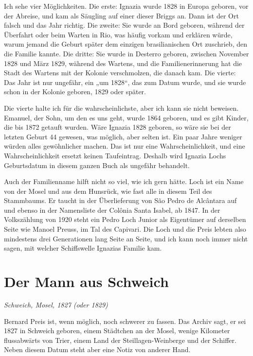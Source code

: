 \documentclass[
  ngerman,
  11pt,
  openany]{book}
\begin{document}
Ich sehe vier Möglichkeiten. Die erste: Ignazia wurde 1828 in Europa
geboren, vor der Abreise, und kam als Säugling auf einer dieser Briggs
an. Dann ist der Ort falsch und das Jahr richtig. Die zweite: Sie wurde
an Bord geboren, während der Überfahrt oder beim Warten in Rio, was
häufig vorkam und erklären würde, warum jemand die Geburt später dem
einzigen brasilianischen Ort zuschrieb, den die Familie kannte. Die
dritte: Sie wurde in Desterro geboren, zwischen November 1828 und März
1829, während des Wartens, und die Familienerinnerung hat die Stadt des
Wartens mit der Kolonie verschmolzen, die danach kam. Die vierte: Das
Jahr ist nur ungefähr, ein „um 1828``, das zum Datum wurde, und sie
wurde schon in der Kolonie geboren, 1829 oder später.

Die vierte halte ich für die wahrscheinlichste, aber ich kann sie nicht
beweisen. Emanuel, der Sohn, um den es uns geht, wurde 1864 geboren, und
es gibt Kinder, die bis 1872 getauft wurden. Wäre Ignazia 1828 geboren,
so wäre sie bei der letzten Geburt 44 gewesen, was möglich, aber selten
ist. Ein paar Jahre weniger würden alles gewöhnlicher machen. Das ist
nur eine Wahrscheinlichkeit, und eine Wahrscheinlichkeit ersetzt keinen
Taufeintrag. Deshalb wird Ignazia Lochs Geburtsdatum in diesem ganzen
Buch als ungefähr behandelt.

Auch der Familienname hilft nicht so viel, wie ich gern hätte. Loch ist
ein Name von der Mosel und aus dem Hunsrück, wie fast alle in diesem
Teil des Stammbaums. Er taucht in der Überlieferung von São Pedro de
Alcântara auf und ebenso in der Namensliste der Colônia Santa Isabel, ab
1847. In der Volkszählung von 1920 steht ein Pedro Loch Junior als
Eigentümer auf derselben Seite wie Manoel Preuss, im Tal des Capivari.
Die Loch und die Preis lebten also mindestens drei Generationen lang
Seite an Seite, und ich kann noch immer nicht sagen, mit welcher
Schiffswelle Ignazias Familie kam.

\section{Der Mann aus Schweich}\label{der-mann-aus-schweich}

\emph{Schweich, Mosel, 1827 (oder 1829)}

Bernard Preis ist, wenn möglich, noch schwerer zu fassen. Das Archiv
sagt, er sei 1827 in Schweich geboren, einem Städtchen an der Mosel,
wenige Kilometer flussabwärts von Trier, einem Land der
Steillagen-Weinberge und der Schiffer. Neben diesem Datum steht aber
eine Notiz von anderer Hand.
\end{document}
